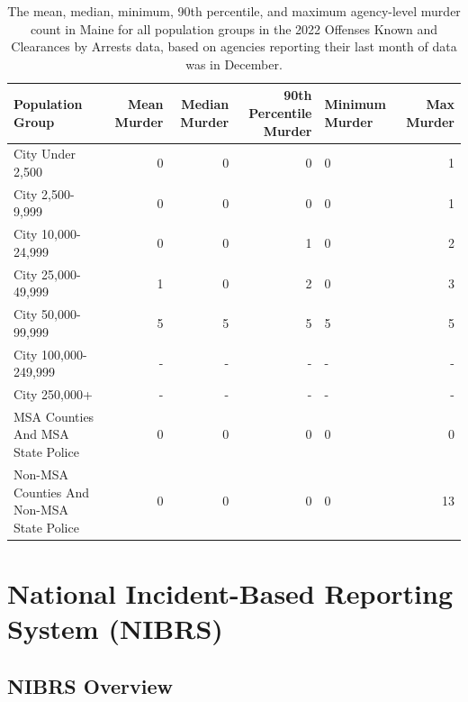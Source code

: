 \documentclass[
  12pt,
  openany]{book}
\begin{document}
\begin{longtable}[t]{lrrrlr}
\caption{\label{tab:countyPopulationGroupStatsMaine}The mean, median, minimum, 90th percentile, and maximum agency-level murder count in Maine for all population groups in the 2022 Offenses Known and Clearances by Arrests data, based on agencies reporting their last month of data was in December.}\\
\toprule
Population Group & Mean Murder & Median Murder & 90th Percentile Murder & Minimum Murder & Max Murder\\
\midrule
City Under 2,500 & 0 & 0 & 0 & 0 & 1\\
City 2,500-9,999 & 0 & 0 & 0 & 0 & 1\\
City 10,000-24,999 & 0 & 0 & 1 & 0 & 2\\
City 25,000-49,999 & 1 & 0 & 2 & 0 & 3\\
City 50,000-99,999 & 5 & 5 & 5 & 5 & 5\\
\addlinespace
City 100,000-249,999 & - & - & - & - & -\\
City 250,000+ & - & - & - & - & -\\
MSA Counties And MSA State Police & 0 & 0 & 0 & 0 & 0\\
Non-MSA Counties And Non-MSA State Police & 0 & 0 & 0 & 0 & 13\\
\bottomrule
\end{longtable}

\part{National Incident-Based Reporting System (NIBRS)}\label{part-national-incident-based-reporting-system-nibrs}

\chapter{NIBRS Overview}\label{nibrs-overview}
\end{document}
